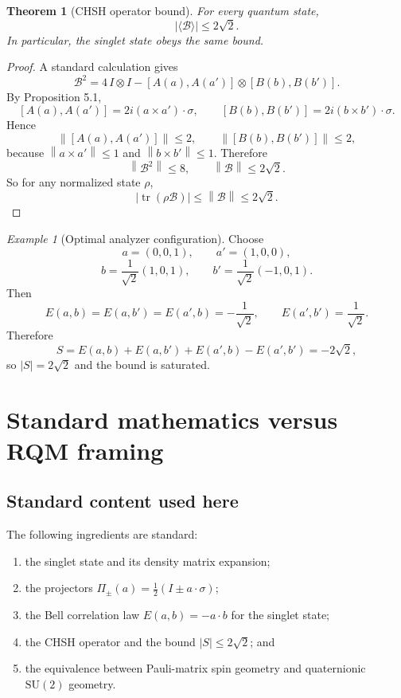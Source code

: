 \documentclass[11pt]{article}
\newtheorem{theorem}[definition]{Theorem}
\theoremstyle{remark}
\newtheorem{example}[definition]{Example}
\newcommand{\SU}{\mathrm{SU}}
\newcommand{\Id}{I}
\newcommand{\tr}{\operatorname{tr}}
\newcommand{\abs}[1]{\left\lvert #1 \right\rvert}
\newcommand{\norm}[1]{\left\lVert #1 \right\rVert}
\begin{document}
\begin{theorem}[CHSH operator bound]
For every quantum state,
\begin{equation}
\abs{\langle \mathcal{B}\rangle} \le 2\sqrt2.
\label{eq:tsirelson}
\end{equation}
In particular, the singlet state obeys the same bound.
\end{theorem}

\begin{proof}
A standard calculation gives
\[
\mathcal{B}^2
=
4\,\Id\otimes\Id - [A(a),A(a')]\otimes[B(b),B(b')].
\]
By Proposition 5.1,
\[
[A(a),A(a')] = 2i(a\times a')\cdot \sigma,
\qquad
[B(b),B(b')] = 2i(b\times b')\cdot \sigma.
\]
Hence
\[
\norm{[A(a),A(a')]} \le 2,
\qquad
\norm{[B(b),B(b')]} \le 2,
\]
because $\norm{a\times a'}\le 1$ and $\norm{b\times b'}\le 1$. Therefore
\[
\norm{\mathcal{B}^2}\le 8,
\qquad
\norm{\mathcal{B}}\le 2\sqrt2.
\]
So for any normalized state $\rho$,
\[
\abs{\tr(\rho\mathcal{B})}\le \norm{\mathcal{B}}\le 2\sqrt2.
\]
\end{proof}

\begin{example}[Optimal analyzer configuration]
Choose
\[
a=(0,0,1),\qquad
a'=(1,0,0),
\]
\[
b=\frac{1}{\sqrt2}(1,0,1),\qquad
b'=\frac{1}{\sqrt2}(-1,0,1).
\]
Then
\[
E(a,b)=E(a,b')=E(a',b)=-\frac{1}{\sqrt2},
\qquad
E(a',b')=\frac{1}{\sqrt2}.
\]
Therefore
\begin{equation}
S
=
E(a,b)+E(a,b')+E(a',b)-E(a',b')
=
-2\sqrt2,
\label{eq:optimal-s}
\end{equation}
so $\abs{S}=2\sqrt2$ and the bound is saturated.
\end{example}

\section{Standard mathematics versus RQM framing}

\subsection{Standard content used here}

The following ingredients are standard:
\begin{enumerate}
\item the singlet state and its density matrix expansion;
\item the projectors $\Pi_{\pm}(a)=\frac12(\Id\pm a\cdot \sigma)$;
\item the Bell correlation law $E(a,b)=-a\cdot b$ for the singlet state;
\item the CHSH operator and the bound $\abs{S}\le 2\sqrt2$; and
\item the equivalence between Pauli-matrix spin geometry and quaternionic $\SU(2)$ geometry.
\end{enumerate}
\end{document}
